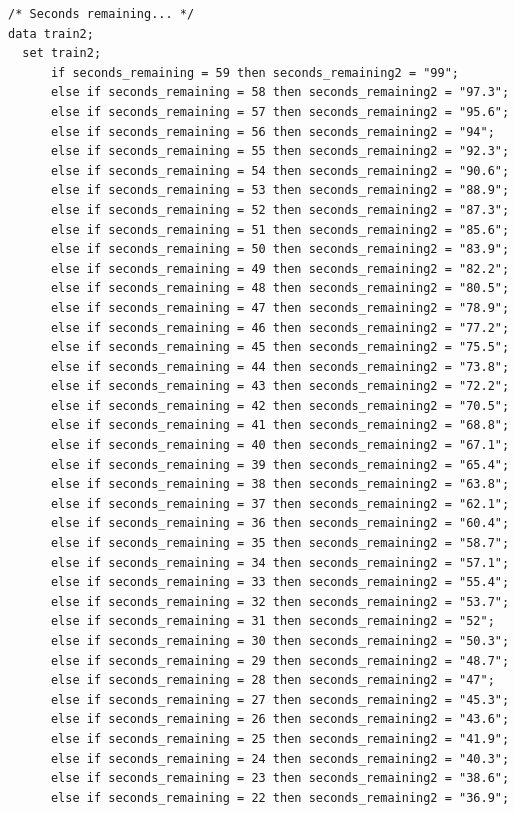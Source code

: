 \begin{verbatim}
/* Seconds remaining... */
data train2;
  set train2;
      if seconds_remaining = 59 then seconds_remaining2 = "99";
      else if seconds_remaining = 58 then seconds_remaining2 = "97.3";
	  else if seconds_remaining = 57 then seconds_remaining2 = "95.6";
	  else if seconds_remaining = 56 then seconds_remaining2 = "94";
	  else if seconds_remaining = 55 then seconds_remaining2 = "92.3";
	  else if seconds_remaining = 54 then seconds_remaining2 = "90.6";
	  else if seconds_remaining = 53 then seconds_remaining2 = "88.9";
	  else if seconds_remaining = 52 then seconds_remaining2 = "87.3";
	  else if seconds_remaining = 51 then seconds_remaining2 = "85.6";
	  else if seconds_remaining = 50 then seconds_remaining2 = "83.9";
	  else if seconds_remaining = 49 then seconds_remaining2 = "82.2";
	  else if seconds_remaining = 48 then seconds_remaining2 = "80.5";
      else if seconds_remaining = 47 then seconds_remaining2 = "78.9";
	  else if seconds_remaining = 46 then seconds_remaining2 = "77.2";
	  else if seconds_remaining = 45 then seconds_remaining2 = "75.5";
	  else if seconds_remaining = 44 then seconds_remaining2 = "73.8";
	  else if seconds_remaining = 43 then seconds_remaining2 = "72.2";
	  else if seconds_remaining = 42 then seconds_remaining2 = "70.5";
	  else if seconds_remaining = 41 then seconds_remaining2 = "68.8";
	  else if seconds_remaining = 40 then seconds_remaining2 = "67.1";
	  else if seconds_remaining = 39 then seconds_remaining2 = "65.4";
	  else if seconds_remaining = 38 then seconds_remaining2 = "63.8";
	  else if seconds_remaining = 37 then seconds_remaining2 = "62.1";
	  else if seconds_remaining = 36 then seconds_remaining2 = "60.4";
	  else if seconds_remaining = 35 then seconds_remaining2 = "58.7";
	  else if seconds_remaining = 34 then seconds_remaining2 = "57.1";
	  else if seconds_remaining = 33 then seconds_remaining2 = "55.4";
	  else if seconds_remaining = 32 then seconds_remaining2 = "53.7";
	  else if seconds_remaining = 31 then seconds_remaining2 = "52";
	  else if seconds_remaining = 30 then seconds_remaining2 = "50.3";
	  else if seconds_remaining = 29 then seconds_remaining2 = "48.7";
      else if seconds_remaining = 28 then seconds_remaining2 = "47";
	  else if seconds_remaining = 27 then seconds_remaining2 = "45.3";
	  else if seconds_remaining = 26 then seconds_remaining2 = "43.6";
	  else if seconds_remaining = 25 then seconds_remaining2 = "41.9";
	  else if seconds_remaining = 24 then seconds_remaining2 = "40.3";
	  else if seconds_remaining = 23 then seconds_remaining2 = "38.6";
	  else if seconds_remaining = 22 then seconds_remaining2 = "36.9";

\end{verbatim}
